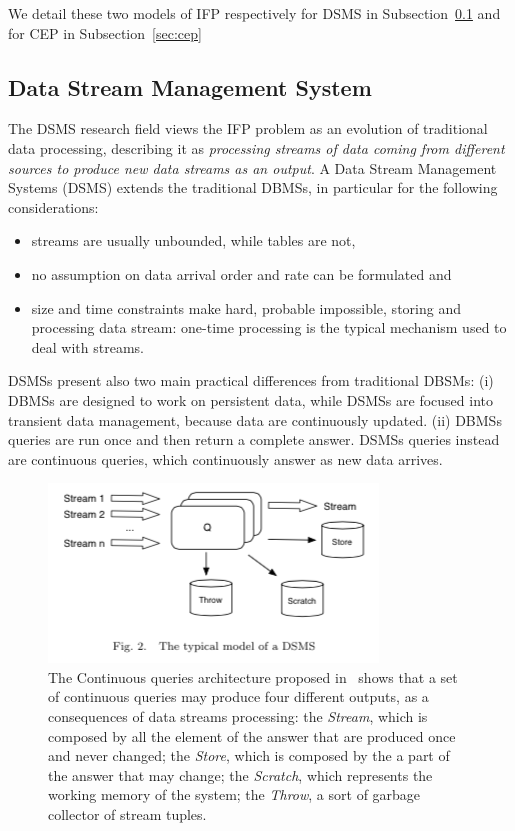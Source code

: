 We detail these two models of IFP respectively for DSMS in Subsection~\ref{sec:dsms} and for CEP in Subsection~\ref{sec:cep}

\subsection{Data Stream Management System}\label{sec:dsms}
The DSMS research field views the IFP problem as an evolution of traditional data processing, describing it as \textit{processing streams of data coming from different sources to produce new data streams as an output}. A Data Stream Management Systems (DSMS) extends the traditional DBMSs, in particular for the following considerations:

\begin{itemize}
\item streams are usually unbounded, while tables are not,
\item no assumption on data arrival order and rate can be formulated and
\item size and time constraints make hard, probable impossible, storing and processing data stream: one-time processing is the typical mechanism used to deal with streams.
\end{itemize} 

DSMSs present also two main practical differences from traditional DBSMs: (i) DBMSs are designed to work on persistent data, while DSMSs are focused into transient data management, because data are continuously updated. (ii) DBMSs queries are run once and then return a complete answer. DSMSs queries instead are continuous queries, which continuously answer as new data arrives. 

\begin{figure}[tbh]
  \centering
	\includegraphics[width=0.75\linewidth]{images/dsms}
	\caption[General Continuous Queries Architecture]{The Continuous queries architecture proposed in~\cite{Babu:2001:CQO:603867.603884} shows that  a set of continuous queries may produce four different outputs, as a consequences of data streams processing: the \textit{Stream}, which is composed by all the element of the answer that are produced once and never changed; the \textit{Store}, which is composed by the a part of the answer that may change; the \textit{Scratch}, which represents the working memory of the system; the \textit{Throw}, a sort of garbage collector of stream tuples.} 
  	\label{fig:dsms}
\end{figure}

